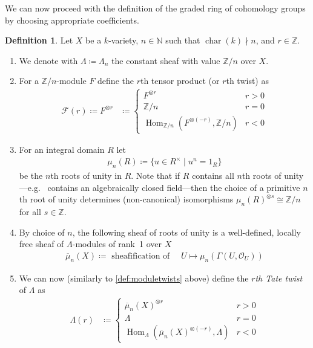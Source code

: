 \documentclass[english]{scrartcl}
\theoremstyle{definition}
\newtheorem{Def}{Definition}[section]
\theoremstyle{remark}
\newcommand*{\N}{\mathds{N}}
\newcommand*{\Z}{\mathds{Z}}
\newcommand*{\Zmod}[1]{\Z/#1} %
\newcommand*{\F}{\mathcal{F}} %
\DeclareMathOperator{\Char}{char} %
\DeclareMathOperator{\Hom}{Hom} %
\newcommand*{\forexample}{e.g.\ }
\begin{document}
We can now proceed with the definition of the graded ring of
cohomology groups by choosing appropriate coefficients.
\begin{Def}\label{def:coefficients}
  Let $X$ be a $k$-variety,
  $n\in\N$ such that $\Char(k)\nmid n$,
  and $r\in\Z$.
  \begin{enumerate}
  \item We denote with $\Lambda\coloneqq\Lambda_n$ the constant sheaf
    with value $\Zmod{n}$ over $X$.
  \item\label{def:moduletwists}
    For a $\Zmod{n}$-module $F$ define the $r$th tensor product
    (or $r$th twist) as
    \begin{align*}
      \F(r)\coloneqq F^{\otimes r}
      &\coloneqq \begin{cases}
        F^{\otimes r} &r>0\\
        \Zmod{n} &r=0\\
        \Hom_{\Zmod{n}}(F^{\otimes (-r)},\Zmod{n}) &r<0
      \end{cases}
    \end{align*}
  \item\label{def:rootsofunity} For an integral domain $R$ let
    \begin{gather*}
      \mu_n(R)\coloneqq\{ u\in R^\times\;|\;u^n=1_R\}
    \end{gather*}
    be the $n$th roots of unity in $R$. 
    Note that if $R$ contains all $n$th roots of unity---\forexample
    contains an algebraically closed field---then the choice of a
    primitive $n$th root of unity determines (non-canonical) isomorphisms
    $\mu_n(R)^{\otimes s}\cong\Zmod{n}$ for all $s\in\Z$.
  \item By choice of $n$, the following sheaf of roots of unity is a
    well-defined, locally free sheaf of $\Lambda$-modules of rank~1
    over $X$
    \begin{gather*}
      \overline\mu_n(X) \coloneqq \text{ sheafification of }\quad
      U\mapsto \mu_n(\Gamma(U,\mathcal O_U))
    \end{gather*}
  \item\label{def:tatetwist}
    We can now (similarly to \ref{def:moduletwists} above) define the
    \emph{$r$th Tate twist} of $\Lambda$ as
    \begin{align*}
      \Lambda(r) &\coloneqq \begin{cases}
        \overline\mu_n(X)^{\otimes r} &r>0\\
        \Lambda &r=0\\
        \Hom_{\Lambda}(\overline\mu_n(X)^{\otimes (-r)},\Lambda) &r<0

\end{cases}
\end{align*}
\end{enumerate}
\end{Def}
\end{document}
